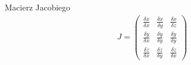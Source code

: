 Macierz Jacobiego
\begin{align*}
J= \left(
\begin{array}{ccc}
\frac{\delta \dot{x}}{\delta x} & \frac{\delta \dot{x}}{\delta y} & \frac{\delta \dot{x}}{\delta z} \\
\frac{\delta \dot{y}}{\delta x} & \frac{\delta \dot{y}}{\delta y} & \frac{\delta \dot{y}}{\delta y} \\
\frac{\delta \dot{z}}{\delta x} & \frac{\delta \dot{z}}{\delta y} & \frac{\delta \dot{z}}{\delta x}
\end{array}
\right)
\end{align*}















